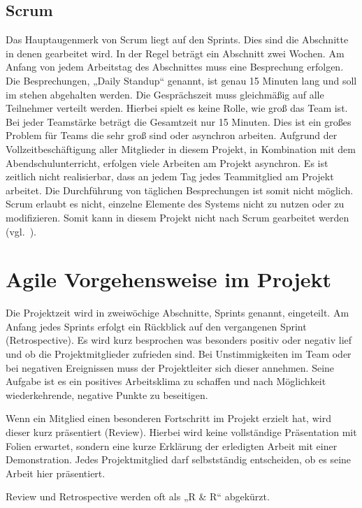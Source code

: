 \subsection{Scrum}
Das Hauptaugenmerk von Scrum liegt auf den Sprints. Dies sind die Abschnitte in
denen gearbeitet wird. In der Regel beträgt ein Abschnitt zwei Wochen. Am
Anfang von jedem Arbeitstag des Abschnittes muss eine Besprechung erfolgen. Die
Besprechungen, „Daily Standup“ genannt, ist genau 15 Minuten lang und soll im
stehen abgehalten werden. Die Gesprächszeit muss gleichmäßig auf alle
Teilnehmer verteilt werden. Hierbei spielt es keine Rolle, wie groß das Team
ist. Bei jeder Teamstärke beträgt die Gesamtzeit nur 15 Minuten. Dies ist ein
großes Problem für Teams die sehr groß sind oder asynchron arbeiten. Aufgrund
der Vollzeitbeschäftigung aller Mitglieder in diesem Projekt, in Kombination
mit dem Abendschulunterricht, erfolgen viele Arbeiten am Projekt asynchron. Es
ist zeitlich nicht realisierbar, dass an jedem Tag jedes Teammitglied am
Projekt arbeitet. Die Durchführung von täglichen Besprechungen ist somit nicht
möglich. Scrum erlaubt es nicht, einzelne Elemente des Systems nicht zu nutzen
oder zu modifizieren. Somit kann in diesem Projekt nicht nach Scrum gearbeitet
werden (vgl.~\cite{scrum_talk}).
\tm%

\section{Agile Vorgehensweise im Projekt}
\label{sec:agile_vorgehensweise}
Die Projektzeit wird in zweiwöchige Abschnitte, Sprints genannt, eingeteilt. Am
Anfang jedes Sprints erfolgt ein Rückblick auf den vergangenen Sprint
(Retrospective). Es wird kurz besprochen was besonders positiv oder negativ
lief und ob die Projektmitglieder zufrieden sind. Bei Unstimmigkeiten im Team
oder bei negativen Ereignissen muss der Projektleiter sich dieser annehmen.
Seine Aufgabe ist es ein positives Arbeitsklima zu schaffen und nach
Möglichkeit wiederkehrende, negative Punkte zu beseitigen.

Wenn ein Mitglied einen besonderen Fortschritt im Projekt erzielt hat, wird
dieser kurz präsentiert (Review). Hierbei wird keine vollständige Präsentation
mit Folien erwartet, sondern eine kurze Erklärung der erledigten Arbeit mit
einer Demonstration. Jedes Projektmitglied darf selbstständig entscheiden, ob
es seine Arbeit hier präsentiert.

Review und Retrospective werden oft als „R \& R“ abgekürzt.

